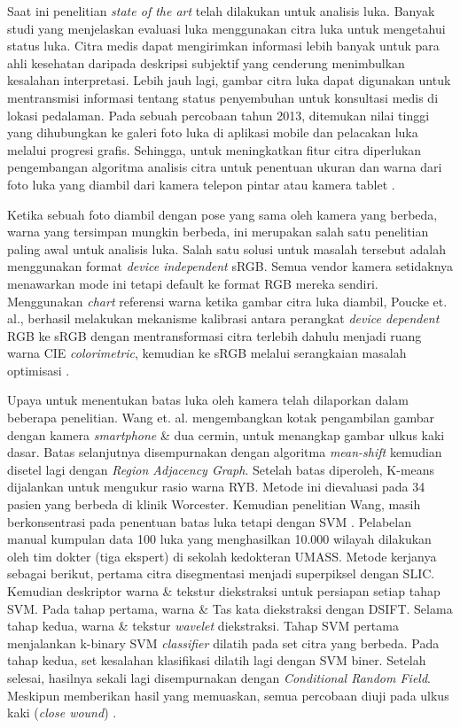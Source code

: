 Saat ini penelitian \emph{state of the art} telah dilakukan untuk analisis luka. Banyak studi yang menjelaskan evaluasi luka menggunakan citra luka untuk mengetahui status luka. Citra medis dapat mengirimkan informasi lebih banyak untuk para ahli kesehatan daripada deskripsi subjektif yang cenderung menimbulkan kesalahan interpretasi. Lebih jauh lagi, gambar citra luka dapat digunakan untuk mentransmisi informasi tentang status penyembuhan untuk konsultasi medis di lokasi pedalaman. Pada sebuah percobaan tahun 2013, ditemukan nilai tinggi yang dihubungkan ke galeri foto luka di aplikasi mobile dan pelacakan luka melalui progresi grafis. Sehingga, untuk meningkatkan fitur citra diperlukan pengembangan algoritma analisis citra untuk penentuan ukuran dan warna dari foto luka yang diambil dari kamera telepon pintar atau kamera tablet \citep{poon2015algorithms:12}. %

Ketika sebuah foto diambil dengan pose yang sama oleh kamera yang berbeda, warna yang tersimpan mungkin berbeda, ini merupakan salah satu penelitian paling awal untuk analisis luka. Salah satu solusi untuk masalah tersebut adalah menggunakan format \emph{device independent} sRGB. Semua vendor kamera setidaknya menawarkan mode ini tetapi default ke format RGB mereka sendiri. Menggunakan \emph{chart} referensi warna ketika gambar citra luka diambil, Poucke et. al., berhasil melakukan mekanisme kalibrasi antara perangkat \emph{device dependent} RGB ke sRGB dengan mentransformasi citra terlebih dahulu menjadi ruang warna CIE \emph{colorimetric}, kemudian ke sRGB melalui serangkaian masalah optimisasi \citep{van2010automatic:13}. %

Upaya untuk menentukan batas luka oleh kamera telah dilaporkan dalam beberapa penelitian. Wang et. al. mengembangkan kotak pengambilan gambar dengan kamera \emph{smartphone} \& dua cermin, untuk menangkap gambar ulkus kaki dasar. Batas selanjutnya disempurnakan dengan algoritma \emph{mean-shift} kemudian disetel lagi dengan \emph{Region Adjacency Graph}. Setelah batas diperoleh, K-means dijalankan untuk mengukur rasio warna RYB. Metode ini dievaluasi pada 34 pasien yang berbeda di klinik Worcester. Kemudian penelitian Wang, masih berkonsentrasi pada penentuan batas luka tetapi dengan SVM \citep{wang2016area:15}. Pelabelan manual kumpulan data 100 luka yang menghasilkan 10.000 wilayah dilakukan oleh tim dokter (tiga ekspert) di sekolah kedokteran UMASS. Metode kerjanya sebagai berikut, pertama citra disegmentasi menjadi superpiksel dengan SLIC. Kemudian deskriptor warna \& tekstur diekstraksi untuk persiapan setiap tahap SVM. Pada tahap pertama, warna \& Tas kata diekstraksi dengan DSIFT. Selama tahap kedua, warna \& tekstur \emph{wavelet} diekstraksi. Tahap SVM pertama menjalankan k-binary SVM \emph{classifier} dilatih pada set citra yang berbeda. Pada tahap kedua, set kesalahan klasifikasi dilatih lagi dengan SVM biner. Setelah selesai, hasilnya sekali lagi disempurnakan dengan \emph{Conditional Random Field}. Meskipun memberikan hasil yang memuaskan, semua percobaan diuji pada ulkus kaki (\emph{close wound}) \citep{wang2014smartphone:14}. %


